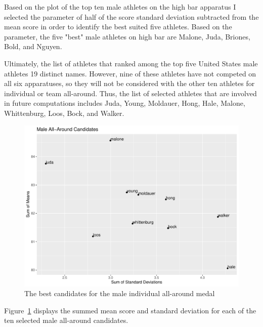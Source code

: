 \documentclass[12pt]{article}
\begin{document}
  Based on the plot of the top ten male athletes on the high bar apparatus I selected the parameter of 
  half of the score standard deviation subtracted from the mean score in order to identify the best suited five 
  athletes. Based on the parameter, the five "best" male athletes on high bar are Malone, Juda, Briones, Bold, and 
  Nguyen.

  Ultimately, the list of athletes that ranked among the top five United States male athletes 19 distinct 
  names. However, nine of these athletes have not competed on all six apparatuses, so they will not be considered 
  with the other ten athletes for individual or team all-around. Thus, the list of selected athletes that 
  are involved in future computations includes Juda, Young, Moldauer, Hong, Hale, Malone, Whittenburg, Loos, 
  Bock, and Walker.

\begin{figure}
    \centering
    \includegraphics[scale=0.6]{MaleAthletesAACandidates.pdf}
    \caption{The best candidates for the male individual all-around medal}
    \label{fig:IAAM}
  \end{figure}

  Figure~\ref{fig:IAAM} displays the summed mean score and standard deviation 
  for each of the ten selected male all-around candidates.
\end{document}
